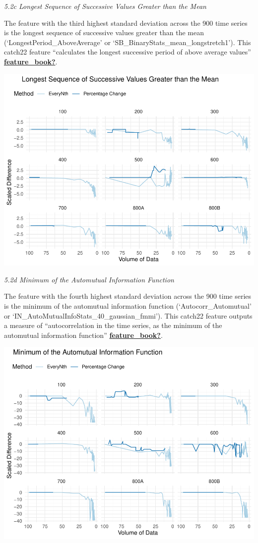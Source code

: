 \documentclass{article}
\begin{document}
\emph{5.2c Longest Sequence of Successive Values Greater than the Mean}

The feature with the third highest standard deviation across the 900
time series is the longest sequence of successive values greater than
the mean (`LongestPeriod\_AboveAverage' or
`SB\_BinaryStats\_mean\_longstretch1'). This catch22 feature
``calculates the longest successive period of above average values''
\protect\hyperlink{ref-feature_book}{\textbf{feature\_book?}}.

\includegraphics{210431461_CSC8639_Dissertation_files/figure-latex/LongestGreater-1.pdf}

\emph{5.2d Minimum of the Automutual Information Function}

The feature with the fourth highest standard deviation across the 900
time series is the minimum of the automutual information function
(`Autocorr\_Automutual' or
`IN\_AutoMutualInfoStats\_40\_gaussian\_fmmi'). This catch22 feature
outputs a measure of ``autocorrelation in the time series, as the
minimum of the automutual information function''
\protect\hyperlink{ref-feature_book}{\textbf{feature\_book?}}.

\includegraphics{210431461_CSC8639_Dissertation_files/figure-latex/AutoMutalFunction-1.pdf}
\end{document}
